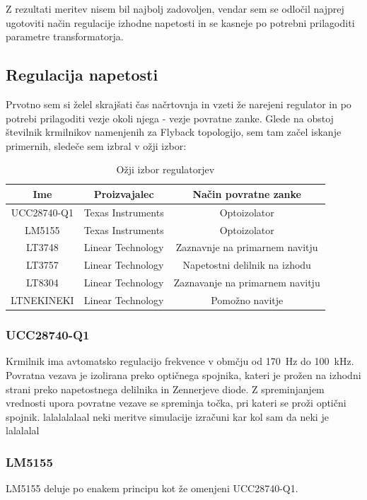 \documentclass[a4paper,twoside,openright,12pt,slovene]{book}
\begin{document}
Z rezultati meritev nisem bil najbolj zadovoljen, vendar sem se odločil najprej ugotoviti način regulacije izhodne napetosti in se kasneje po potrebni prilagoditi parametre transformatorja. 

	\subsection{Regulacija napetosti} \label{RegulacijaNapetosti}
	Prvotno sem si želel skrajšati čas načrtovnja in vzeti že narejeni regulator in po potrebi prilagoditi vezje okoli njega - vezje povratne zanke. Glede na obstoj številnik krmilnikov namenjenih za Flyback topologijo, sem tam začel iskanje primernih, sledeče sem izbral v ožji izbor:
	
\begin{table}[h!]
\centering
\begin{tabular}{||c | c |c||}
\hline
Ime & Proizvajalec & Način povratne zanke \\[0.5ex]
\hline\hline
UCC28740-Q1 & Texas Instruments & Optoizolator \\
LM5155 & Texas Instruments & Optoizolator \\
LT3748 & Linear Technology & Zaznavnje na primarnem navitju \\
LT3757 & Linear Technology & Napetostni delilnik na izhodu \\
LT8304 & Linear Technology & Zaznavanje na primarnem navitju \\
LTNEKINEKI & Linear Technology & Pomožno navitje \\ [1ex]
\hline
\end{tabular}
\caption{Ožji izbor regulatorjev}
\end{table}

	\subsubsection{UCC28740-Q1} \label{UCC28740-Q1}
Krmilnik ima avtomatsko regulacijo frekvence v obmčju od \SI{170}{\hertz} do \SI{100}{\kilo\hertz}. Povratna vezava je izolirana preko optičnega spojnika, kateri je prožen na izhodni strani preko napetostnega delilnika in Zennerjeve diode. Z spreminjanjem vrednosti upora povratne vezave se spreminja točka, pri kateri se proži optični spojnik. lalalalalaal neki meritve simulacije izračuni kar kol sam da neki je lalalalal

	\subsubsection{LM5155} \label{LM5155}
LM5155 deluje po enakem principu kot že omenjeni UCC28740-Q1.
\end{document}

